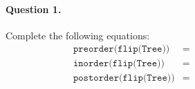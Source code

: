 
\paragraph{Question 1.}

Complete the following equations:
\begin{align*}
   \texttt{preorder(flip(Tree))} &= \phantom{\texttt{rev(postorder(Tree))}}\\
    \texttt{inorder(flip(Tree))} &= \phantom{\texttt{rev(inorder(Tree))}}\\
  \texttt{postorder(flip(Tree))} &= \phantom{\texttt{rev{preorder(Tree)}}}
\end{align*}
